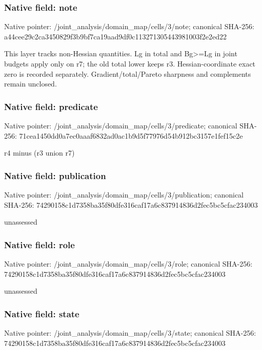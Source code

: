 \documentclass[10pt,a4paper]{article}
\begin{document}
\subsubsection{Native field: note}
Native pointer: /joint\_\allowbreak{}analysis/domain\_\allowbreak{}map/cells/3/note; canonical SHA-256: a44cee29c2ca3450829f3b9bf7ca19aad9df0c113271305443981003f2e2ed22

\begingroup\raggedright\sloppy This layer tracks non-Hessian quantities. Lg in total and Bg>=\allowbreak{}Lg in joint budgets apply only on r7;\allowbreak{} the old total lower keeps r3. Hessian-coordinate exact zero is recorded separately. Gradient/\allowbreak{}total/\allowbreak{}Pareto sharpness and complements remain unclosed.\par\endgroup

\subsubsection{Native field: predicate}
Native pointer: /joint\_\allowbreak{}analysis/domain\_\allowbreak{}map/cells/3/predicate; canonical SHA-256: 71cea1450dd0a7ec0aaaf6832ad0ac1b9d5f77976d54b912bc3157e1fef15c2e

\begingroup\raggedright\sloppy r4 minus (r3 union r7)\par\endgroup

\subsubsection{Native field: publication}
Native pointer: /joint\_\allowbreak{}analysis/domain\_\allowbreak{}map/cells/3/publication; canonical SHA-256: 74290158c1d7358ba35f80dfe316caf17a6c837914836d2fec5bc5cfac234003

\begingroup\raggedright\sloppy unassessed\par\endgroup

\subsubsection{Native field: role}
Native pointer: /joint\_\allowbreak{}analysis/domain\_\allowbreak{}map/cells/3/role; canonical SHA-256: 74290158c1d7358ba35f80dfe316caf17a6c837914836d2fec5bc5cfac234003

\begingroup\raggedright\sloppy unassessed\par\endgroup

\subsubsection{Native field: state}
Native pointer: /joint\_\allowbreak{}analysis/domain\_\allowbreak{}map/cells/3/state; canonical SHA-256: 74290158c1d7358ba35f80dfe316caf17a6c837914836d2fec5bc5cfac234003
\end{document}
